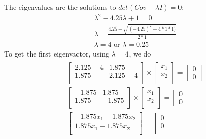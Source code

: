 \documentclass[leqno]{article}
\begin{document}
The eigenvalues are the solutions to $det(Cov - \lambda I) = 0$:
\begin{equation*}
\begin{split}
&\lambda^2 - 4.25\lambda + 1 = 0\\
&\lambda = \frac{4.25 \pm \sqrt{(-4.25)^2 - 4*1*1)}}{2*1}\\
&\lambda = 4\mbox{ or }\lambda = 0.25
\end{split}
\end{equation*} 
To get the first eigenvactor, using $\lambda = 4$, we do
\begin{gather*}
\begin{split}
&\begin{bmatrix}
    2.125 - 4 & 1.875 \\
    1.875 & 2.125 - 4\\  
\end{bmatrix} \times \begin{bmatrix}
   x_1\\
   x_2\\
\end{bmatrix} =
\begin{bmatrix}
   0\\
   0
\end{bmatrix}
\\
&\begin{bmatrix}
    -1.875 & 1.875 \\
    1.875 & -1.875\\  
\end{bmatrix} \times \begin{bmatrix}
   x_1\\
   x_2\\
\end{bmatrix} =
\begin{bmatrix}
   0\\
   0
\end{bmatrix}
\\
&\begin{bmatrix}
    -1.875x_1 + 1.875x_2 \\
    1.875x_1  -1.875x_2\\  
\end{bmatrix} =
\begin{bmatrix}
   0\\
   0\\
\end{bmatrix}
\end{split}
\end{gather*}
\end{document}
